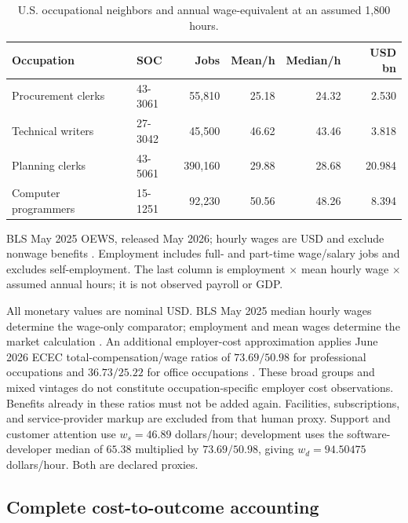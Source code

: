 \begin{table}[tbp]
\centering\small
\caption{U.S. occupational neighbors and annual wage-equivalent at an assumed 1,800 hours.}
\label{tab:ec-labor}
\begin{tabular}{llrrrr}
\toprule
Occupation & SOC & Jobs & Mean/h & Median/h & USD bn \\
\midrule
Procurement clerks & 43-3061 & 55,810 & 25.18 & 24.32 & 2.530 \\
Technical writers & 27-3042 & 45,500 & 46.62 & 43.46 & 3.818 \\
Planning clerks & 43-5061 & 390,160 & 29.88 & 28.68 & 20.984 \\
Computer programmers & 15-1251 & 92,230 & 50.56 & 48.26 & 8.394 \\
\bottomrule
\end{tabular}
\par\smallskip\begin{minipage}{0.97\linewidth}\footnotesize BLS May 2025 OEWS, released May 2026; hourly wages are USD and exclude nonwage benefits \cite{blsoews2025,blsoewsfaq}. Employment includes full- and part-time wage/salary jobs and excludes self-employment. The last column is employment $\times$ mean hourly wage $\times$ assumed annual hours; it is not observed payroll or GDP.
\end{minipage}
\end{table}


All monetary values are nominal USD. BLS May 2025 median hourly wages determine
the wage-only comparator; employment and mean wages determine the market
calculation \cite{blsoews2025}. An additional employer-cost approximation applies
June 2026 ECEC total-compensation/wage ratios of $73.69/50.98$ for professional
occupations and $36.73/25.22$ for office occupations \cite{blsecec2026}. These
broad groups and mixed vintages do not constitute occupation-specific employer
cost observations. Benefits already in these ratios must not be added again.
Facilities, subscriptions, and service-provider markup are excluded from that
human proxy. Support and customer attention use $w_s=46.89$ dollars/hour;
development uses the software-developer median of $65.38$ multiplied by
$73.69/50.98$, giving $w_d=94.50475$ dollars/hour. Both are declared proxies.

\subsection{Complete cost-to-outcome accounting}

